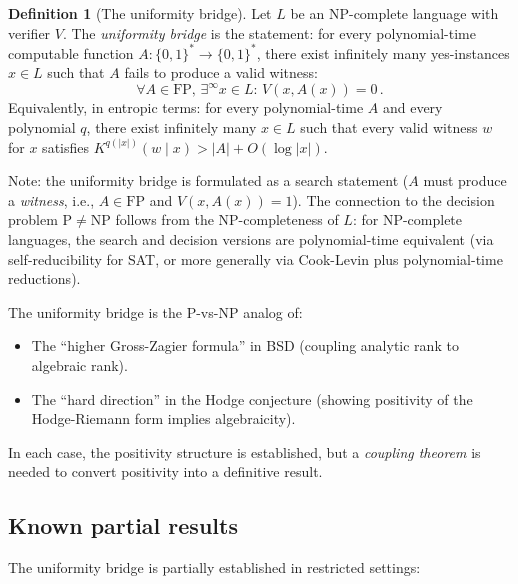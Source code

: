 \documentclass[aps,prd,twocolumn,superscriptaddress,nofootinbib]{revtex4-2}
\theoremstyle{definition}
\newtheorem{definition}[theorem]{Definition}
\theoremstyle{remark}
\newcommand{\NP}{\mathrm{NP}}
\newcommand{\PP}{\mathrm{P}}
\begin{document}
\begin{definition}[The uniformity bridge]
\label{def:uniformity}
Let $L$ be an NP-complete language with verifier $V$. The \textit{uniformity bridge} is the statement: for every polynomial-time computable function $A: \{0,1\}^* \to \{0,1\}^*$, there exist infinitely many yes-instances $x \in L$ such that $A$ fails to produce a valid witness:
\begin{equation}
\forall A \in \mathrm{FP},\, \exists^\infty x \in L:\, V(x, A(x)) = 0\,.
\end{equation}
Equivalently, in entropic terms: for every polynomial-time $A$ and every polynomial $q$, there exist infinitely many $x \in L$ such that every valid witness $w$ for $x$ satisfies $K^{q(|x|)}(w \mid x) > |A| + O(\log|x|)$.

Note: the uniformity bridge is formulated as a search statement ($A$ must produce a \textit{witness}, i.e., $A \in \mathrm{FP}$ and $V(x, A(x)) = 1$). The connection to the decision problem $\PP \neq \NP$ follows from the NP-completeness of $L$: for NP-complete languages, the search and decision versions are polynomial-time equivalent (via self-reducibility for SAT, or more generally via Cook-Levin plus polynomial-time reductions).
\end{definition}

The uniformity bridge is the P-vs-NP analog of:
\begin{itemize}
\item The ``higher Gross-Zagier formula'' in BSD (coupling analytic rank to algebraic rank).
\item The ``hard direction'' in the Hodge conjecture (showing positivity of the Hodge-Riemann form implies algebraicity).
\end{itemize}

In each case, the positivity structure is established, but a \textit{coupling theorem} is needed to convert positivity into a definitive result.

\subsection{Known partial results}

The uniformity bridge is partially established in restricted settings:
\end{document}
